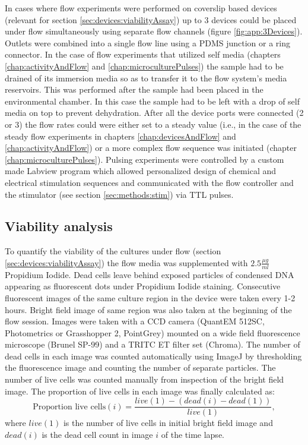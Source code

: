 In cases where flow experiments were performed on coverslip based devices (relevant for section \ref{sec:devices:viabilityAssay}) up to 3 devices could be placed under flow simultaneously using separate flow channels (figure \ref{fig:app:3Devices}). Outlets were combined into a single flow line using a PDMS junction or a ring connector. In the case of flow experiments that utilized self media (chapters \ref{chap:activityAndFlow} and \ref{chap:microculturePulses}) the sample had to be drained of its immersion media so as to transfer it to the flow system's media reservoirs. This was performed after the sample had been placed in the environmental chamber. In this case the sample had to be left with a drop of self media on top to prevent dehydration. After all the device ports were connected (2 or 3) the flow rates could were either set to a steady value (i.e., in the case of the steady flow experiments in chapters \ref{chap:devicesAndFlow} and \ref{chap:activityAndFlow}) or a more complex flow sequence was initiated (chapter \ref{chap:microculturePulses}). Pulsing experiments were controlled by a custom made Labview program which allowed personalized design of chemical and electrical stimulation sequences and communicated with the flow controller and the stimulator (see section \ref{sec:methods:stim}) via TTL pulses.






 \subsection{Viability analysis}
 To quantify the viability of the cultures under flow (section \ref{sec:devices:viabilityAssay}) the flow media was supplemented with \(2.5\frac{\mu g}{ml}\) Propidium Iodide. Dead cells leave behind exposed particles of condensed DNA appearing as fluorescent dots under Propidium Iodide staining. Consecutive fluorescent images of the same culture region in the device were taken every 1-2 hours. Bright field image of same region was also taken at the beginning of the flow session. Images were taken with a CCD camera (QuantEM 512SC, Photometrics or Grasshopper 2, PointGrey) mounted on a wide field fluorescence microscope (Brunel SP-99) and a TRITC ET filter set (Chroma). The number of dead cells in each image was counted automatically using ImageJ by thresholding the fluorescence image and counting the number of separate particles. The number of live cells was counted manually from inspection of the bright field image.
The proportion of live cells in each image was finally calculated as: \[\text{Proportion live cells} (i)=\frac{live(1)-(dead(i)-dead(1))}{live(1)},\] where \(live(1)\) is the number of live cells in initial bright field image and \(dead(i)\) is the dead cell count in image \(i\) of the time lapse.

